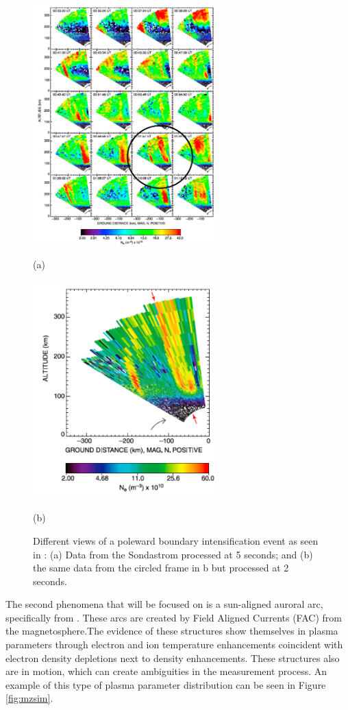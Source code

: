 \begin{figure}[htb]
  \begin{minipage}[t]{0.49\linewidth}\centering
    \includegraphics[width=7cm]{pbiall}
    \medskip
    \centerline{(a)}
  \end{minipage}\hfill
  \begin{minipage}[t]{0.49\linewidth}\centering
    \includegraphics[width=7cm]{pbifast}
    \medskip
    \centerline{(b)}
  \end{minipage}
  \caption{Different views of a poleward boundary intensification event as seen in \cite{Semeter:2005fo}: (a) Data from the Sondastrom processed at 5 seconds; and (b) the same data from the circled frame in b but processed at 2 seconds. }
  \label{fig:Sampling}
\end{figure}

The second phenomena that will be focused on is a sun-aligned auroral arc, specifically from \cite{Perry:2015jf}. These arcs are created by Field Aligned Currents (FAC) from the magnetosphere.The evidence of these structures show themselves in plasma parameters through electron and ion temperature enhancements coincident with electron density depletions next to density enhancements. These structures also are in motion, which can create ambiguities in the measurement process. An example of this type of plasma parameter distribution can be seen in Figure \ref{fig:mzsim}.

